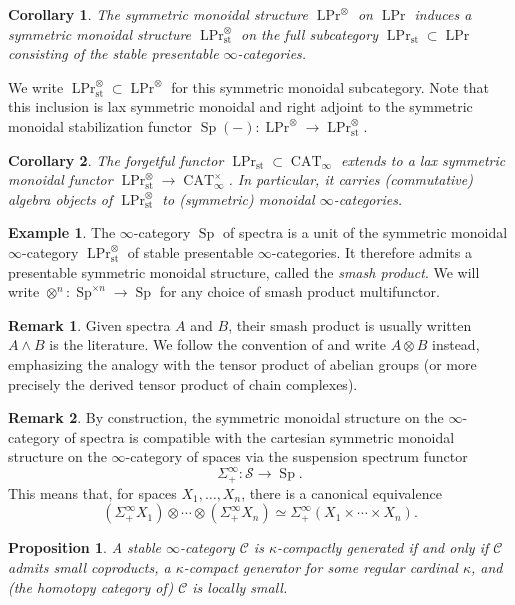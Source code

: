 \documentclass[12pt]{article}
\newtheorem{corollary}{Corollary}[subsection]
\newtheorem{proposition}{Proposition}[subsection]
\theoremstyle{definition}
\newtheorem{example}{Example}[subsection]
\newtheorem{remark}{Remark}[subsection]
\newcommand{\C}{\mathcal{C}}
\renewcommand{\S}{\mathcal{S}}
\renewcommand{\i}{\infty}
\newcommand{\too}{\longrightarrow}
\DeclareMathOperator{\CAT}{CAT}
\DeclareMathOperator{\Prl}{LPr}
\DeclareMathOperator{\Sp}{Sp}
\newcommand{\st}{\mathrm{st}}
\begin{document}
\begin{corollary}
The symmetric monoidal structure $\Prl^\otimes$ on $\Prl$ induces a symmetric monoidal structure $\Prl^\otimes_{\st}$\index{$\Prl^\otimes_{\st}$} on the full subcategory $\Prl_\st\subset\Prl$ consisting of the stable presentable $\infty$-categories.
\end{corollary}
We write $\Prl_{\st}^\otimes\subset\Prl^\otimes$ for this symmetric monoidal subcategory.
Note that this inclusion is lax symmetric monoidal and right adjoint to the symmetric monoidal stabilization functor $\Sp(-):\Prl^\otimes\to\Prl^\otimes_{\st}$.
\begin{corollary}
The forgetful functor $\Prl_{\st}\subset\CAT_\i$ extends to a lax symmetric monoidal functor $\Prl_{\st}^\otimes\to\CAT_\i^\times$.
In particular, it carries (commutative) algebra objects of $\Prl_\st^\otimes$ to (symmetric) monoidal $\infty$-categories.
\end{corollary}
\begin{example}
The $\infty$-category $\Sp$ of spectra is a unit of the symmetric monoidal $\infty$-category $\Prl_{\st}^\otimes$ of stable presentable $\infty$-categories.
It therefore admits a presentable symmetric monoidal structure, called the {\em smash product}.
We will write ${\otimes}^n:\Sp^{\times n}\to\Sp$ for any choice of smash product multifunctor.
\end{example}
\begin{remark}
Given spectra $A$ and $B$, their smash product is usually written $A\land B$ is the literature.
We follow the convention of \cite{HA} and write $A\otimes B$ instead, emphasizing the analogy with the tensor product of abelian groups (or more precisely the derived tensor product of chain complexes).
\end{remark} 
\begin{remark}
By construction, the symmetric monoidal structure on the $\infty$-category of spectra is compatible with the cartesian symmetric monoidal structure on the $\infty$-category of spaces via the suspension spectrum functor\index{$\Sigma^\infty_+$}
\[
\Sigma^\infty_+:\S\too\Sp.
\]
This means that, for spaces $X_1,\ldots,X_n$, there is a canonical equivalence
\[
(\Sigma^\infty_+ X_1)\otimes\cdots\otimes(\Sigma^\infty_+ X_n)\simeq\Sigma^\infty_+(X_1\times\cdots\times X_n).
\]
\end{remark}


\begin{proposition}{\em \cite[Corollary 1.4.4.2]{HA}}
A stable $\infty$-category $\C$ is $\kappa$-compactly generated if and only if $\C$ admits small coproducts, a $\kappa$-compact generator for some regular cardinal $\kappa$, and (the homotopy category of) $\C$ is locally small.
\end{proposition}
\end{document}
